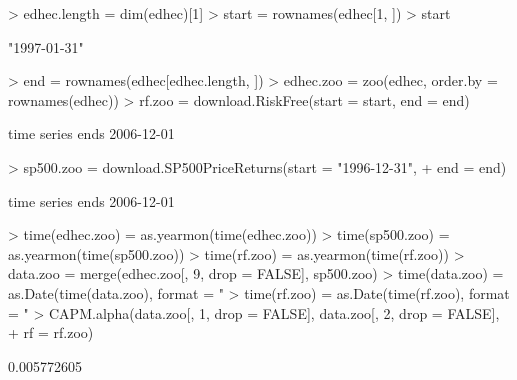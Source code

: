 \documentclass[12pt,letterpaper,english]{article}
\begin{document}

\begin{Examples}
\begin{Schunk}
\begin{Sinput}
> edhec.length = dim(edhec)[1]
> start = rownames(edhec[1, ])
> start
\end{Sinput}
\begin{Soutput}
[1] "1997-01-31"
\end{Soutput}
\begin{Sinput}
> end = rownames(edhec[edhec.length, ])
> edhec.zoo = zoo(edhec, order.by = rownames(edhec))
> rf.zoo = download.RiskFree(start = start, end = end)
\end{Sinput}
\begin{Soutput}
time series ends   2006-12-01
\end{Soutput}
\begin{Sinput}
> sp500.zoo = download.SP500PriceReturns(start = "1996-12-31", 
+     end = end)
\end{Sinput}
\begin{Soutput}
time series ends   2006-12-01
\end{Soutput}
\begin{Sinput}
> time(edhec.zoo) = as.yearmon(time(edhec.zoo))
> time(sp500.zoo) = as.yearmon(time(sp500.zoo))
> time(rf.zoo) = as.yearmon(time(rf.zoo))
> data.zoo = merge(edhec.zoo[, 9, drop = FALSE], sp500.zoo)
> time(data.zoo) = as.Date(time(data.zoo), format = "%b %Y")
> time(rf.zoo) = as.Date(time(rf.zoo), format = "%b %Y")
> CAPM.alpha(data.zoo[, 1, drop = FALSE], data.zoo[, 2, drop = FALSE], 
+     rf = rf.zoo)
\end{Sinput}
\begin{Soutput}
[1] 0.005772605
\end{Soutput}
\end{Schunk}
\end{Examples}
\end{document}
